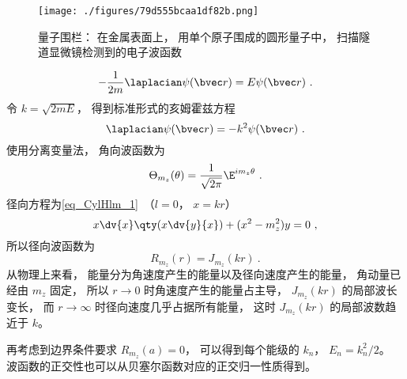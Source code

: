 
\begin{issues}
\issueDraft
\end{issues}


\begin{figure}[ht]
\centering
\texttt{[image: ./figures/79d555bcaa1df82b.png]}
\caption{量子围栏： 在金属表面上， 用单个原子围成的圆形量子中， 扫描隧道显微镜检测到的电子波函数} \label{fig_CirISW_1}
\end{figure}

\begin{equation}
-\frac{1}{2m}\laplacian \psi(\bvec r) = E\psi(\bvec r)~.
\end{equation}
令 $k = \sqrt{2mE}$， 得到标准形式的亥姆霍兹方程
\begin{equation}
\laplacian \psi(\bvec r) = -k^2\psi(\bvec r)~.
\end{equation}
使用分离变量法， 角向波函数为
\begin{equation}
\Theta_{m_z}(\theta) = \frac{1}{\sqrt{2\pi}} \E^{im_z \theta}~.
\end{equation}
径向方程为\autoref{eq_CylHlm_1}~（$l = 0$， $x = kr$）
\begin{equation}
x \dv{x} \qty(x\dv{y}{x}) + (x^2 - m_z^2)y = 0~,
\end{equation}
所以径向波函数为
\begin{equation}
R_{m_z}(r) = J_{m_z}(kr)~.
\end{equation}
从物理上来看， 能量分为角速度产生的能量以及径向速度产生的能量， 角动量已经由 $m_z$ 固定， 所以 $r \to 0$ 时角速度产生的能量占主导， $J_{m_z}(kr)$ 的局部波长变长， 而 $r\to \infty$ 时径向速度几乎占据所有能量， 这时 $J_{m_z}(kr)$ 的局部波数趋近于 $k$。

再考虑到边界条件要求 $R_{m_z}(a)  = 0$， 可以得到每个能级的 $k_n$， $E_n = k_n^2/2$。 波函数的正交性也可以从贝塞尔函数对应的正交归一性质得到。
